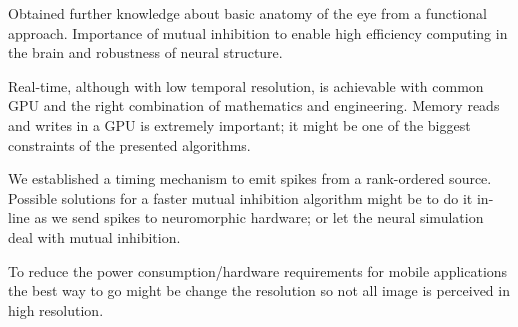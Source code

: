 Obtained further knowledge about basic anatomy of the eye from 
a functional approach. Importance of mutual inhibition to enable 
high efficiency computing in the brain and robustness of neural 
structure. 

Real-time, although with low temporal resolution, is achievable 
with common GPU and the right combination of mathematics and 
engineering. Memory reads and writes in a GPU is extremely important;
it might be one of the biggest constraints of the presented algorithms.

We established a timing mechanism to emit spikes from a rank-ordered
source. Possible solutions for a faster mutual inhibition algorithm 
might be to do it in-line as we send spikes to neuromorphic hardware; 
or let the neural simulation deal with mutual inhibition.

To reduce the power consumption/hardware requirements for mobile applications 
the best way to go might be change the resolution so not all image is 
perceived in high resolution.


